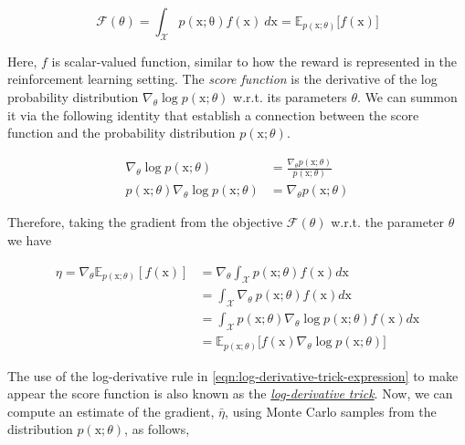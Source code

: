 \begin{equation}\label{eqn:probability-objective}
\mathcal{F}(\theta) = \int_{\mathcal{X}} p(\mathrm{x; \theta})f(\mathrm{x})~d\mathrm{x} = \mathbb{E}_{p(\mathrm{x};\theta)}\big[f(\mathrm{x})\big]
\end{equation}

Here, $f$ is scalar-valued function, similar to how the reward is represented
in the reinforcement learning setting. The \textit{score function} is the derivative of
the log probability distribution $\nabla_{\theta}\log p(\mathrm{x};\theta)$ w.r.t. its parameters $\theta$. We
can summon it via the following identity that establish a connection between
the score function and the probability distribution $p(\mathrm{x};\theta)$.

\begin{equation}\label{eqn:log-derivative-trick-expression}
    \begin{split}
        \nabla_\theta\log p(\mathrm{x};\theta) &= \frac{\nabla_{\theta}p(\mathrm{x}; \theta)}{p(\mathrm{x};\theta)} \\
        p(\mathrm{x};\theta) \nabla_{\theta}\log p(\mathrm{x};\theta) &= \nabla_{\theta}p(\mathrm{x};\theta)
    \end{split}
\end{equation}

Therefore, taking the gradient from the objective $\mathcal{F}(\theta)$ w.r.t. the parameter $\theta$ we have

\begin{equation}
    \begin{split}
        \eta = \nabla_{\theta} \mathbb{E}_{p(\mathrm{x};\theta)}[f(\mathrm{x})] &= \nabla_{\theta}\int_{\mathcal{X}} p(\mathrm{x};\theta) f(\mathrm{x}) d\mathrm{x} \\
        &= \int_\mathcal{X} \nabla_{\theta}~p(\mathrm{x}; \theta)f(\mathrm{x})d\mathrm{x} \\
        &= \int_{\mathcal{X}}p(\mathrm{x};\theta)\nabla_{\theta}\log p(\mathrm{x}; \theta) f(\mathrm{x})d\mathrm{x} \\
        &=\mathbb{E}_{p(\mathrm{x};\theta)}\big[f(\mathrm{x})\nabla_{\theta}\log p(\mathrm{x};\theta) \big] 
    \end{split}
\end{equation}

The use of the log-derivative rule in \ref{eqn:log-derivative-trick-expression} to make appear the score function is also known as the
\href{https://blog.shakirm.com/2015/11/machine-learning-trick-of-the-day-5-log-derivative-trick/}{\textit{log-derivative trick}}.
Now, we can compute an estimate of the gradient, $\bar{\eta}$, using Monte Carlo samples from the distribution $p(\mathrm{x};\theta)$, as follows, 

